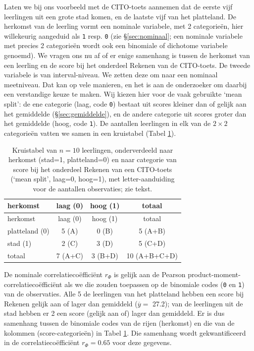\documentclass[
]{book}
\begin{document}
Laten we bij ons voorbeeld met de CITO-toets aannemen dat de eerste vijf
leerlingen uit een grote stad komen, en de laatste vijf van het
platteland. De herkomst van de leerling vormt een nominale variabele,
met 2 categorieën, hier willekeurig aangeduid als \texttt{1} resp. \texttt{0} (zie
§\ref{sec:nominaal}; een nominale variabele met precies 2
categorieën wordt ook een binomiale of dichotome variabele genoemd). We
vragen ons nu af of er enige samenhang is tussen de herkomst van een
leerling en de score bij het onderdeel Rekenen van de CITO-toets. De
tweede variabele is van interval-niveau. We zetten deze om naar een
nominaal meetniveau. Dat kan op vele manieren, en het is aan de
onderzoeker om daarbij een verstandige keuze te maken. Wij kiezen hier
voor de vaak gebruikte `mean split': de ene categorie (laag, code \texttt{0})
bestaat uit scores kleiner dan of gelijk aan het gemiddelde
(§\ref{sec:gemiddelde}), en de andere categorie uit scores groter
dan het gemiddelde (hoog, code \texttt{1}). De aantallen leerlingen in elk van
de \(2\times 2\) categorieën vatten we samen in een kruistabel
(Tabel \ref{tab:cito-kruis}).

\begin{longtable}[]{@{}lccc@{}}
\caption{\label{tab:cito-kruis} Kruistabel van \(n=10\) leerlingen, onderverdeeld naar herkomst
(stad=1, platteland=0) en naar categorie van score bij het onderdeel Rekenen van een
CITO-toets (`mean split', laag=0, hoog=1), met letter-aanduiding voor de aantallen
observaties; zie tekst.}\tabularnewline
\toprule
herkomst & laag (0) & hoog (1) & totaal\tabularnewline
\midrule
\endfirsthead
\toprule
herkomst & laag (0) & hoog (1) & totaal\tabularnewline
\midrule
\endhead
platteland (0) & 5 (A) & 0 (B) & 5 (A+B)\tabularnewline
stad (1) & 2 (C) & 3 (D) & 5 (C+D)\tabularnewline
totaal & 7 (A+C) & 3 (B+D) & 10 (A+B+C+D)\tabularnewline
\bottomrule
\end{longtable}

De nominale correlatiecoëfficiënt \(r_\Phi\) is gelijk aan de Pearson
product-moment-correlatiecoëfficiënt als we die zouden toepassen op de binomiale codes
(\texttt{0} en \texttt{1}) van de observaties. Alle 5 de leerlingen van het platteland
hebben een score bij Rekenen gelijk aan of lager dan gemiddeld
(\(\overline{y}=\) 27.2); van de leerlingen uit de stad hebben er 2 een score
(gelijk aan of) lager dan gemiddeld. Er is dus samenhang tussen de
binomiale codes van de rijen (herkomst) en die van de kolommen
(score-categorieën) in Tabel \ref{tab:cito-kruis}.
Die samenhang wordt gekwantificeerd in de
correlatiecoëfficiënt \(r_\Phi=0.65\) voor deze gegevens.
\end{document}
